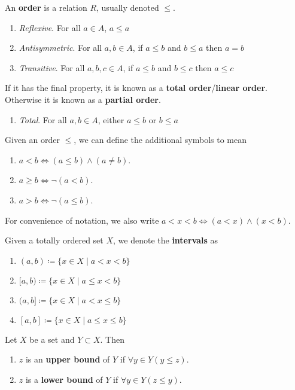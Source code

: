 \documentclass{article}
\begin{document}
    \begin{definition}[Order]
      An \textbf{order} is a relation $R$, usually denoted $\leq$. 
      \begin{enumerate}
        \item \textit{Reflexive}. For all $a \in A$, $a \leq a$
        \item \textit{Antisymmetric}. For all $a,b \in A$, if $a \leq b$ and $b \leq a$ then $a=b$
        \item \textit{Transitive}. For all $a,b,c \in A$, if $a \leq b$ and $b \leq c$ then $a \leq c$
      \end{enumerate} 
      If it has the final property, it is known as a \textbf{total order}/\textbf{linear order}. Otherwise it is known as a \textbf{partial order}. 
      \begin{enumerate}
        \item \textit{Total}. For all $a,b \in A$, either $a \leq b$ or $b \leq a$
      \end{enumerate} 
      Given an order $\leq$, we can define the additional symbols to mean 
      \begin{enumerate}
        \item $a < b \iff (a \leq b) \land (a \neq b)$. 
        \item $a \geq b \iff \neg(a < b)$. 
        \item $a > b \iff \neg(a \leq b)$. 
      \end{enumerate} 
    \end{definition} 

    For convenience of notation, we also write $a < x < b \iff (a < x) \land (x < b)$. 

    \begin{definition}[Interval]
      Given a totally ordered set $X$, we denote the \textbf{intervals} as 
      \begin{enumerate}
        \item $(a, b) \coloneqq \{x \in X \mid a < x < b \}$
        \item $[a, b) \coloneqq \{x \in X \mid a \leq x < b \}$
        \item $(a, b] \coloneqq \{x \in X \mid a < x \leq b \}$
        \item $[a, b] \coloneqq \{x \in X \mid a \leq x \leq b \}$
      \end{enumerate}
    \end{definition} 

    \begin{definition}[Bounds]
      Let $X$ be a set and $Y \subset X$. Then 
      \begin{enumerate}
        \item $z$ is an \textbf{upper bound} of $Y$ if $\forall y \in Y (y \leq z)$. 
        \item $z$ is a \textbf{lower bound} of $Y$ if $\forall y \in Y (z \leq y)$. 
      \end{enumerate}
    \end{definition}
\end{document}
